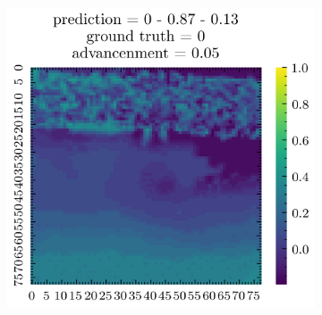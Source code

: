 \begin{figure}[H]
\begin{subfigure}[b]{0.19\textwidth}
    \end{subfigure}  
    \begin{subfigure}[b]{0.19\textwidth}
        \includegraphics[width=\linewidth]{../img/5/quarry/worst/patch-2d-4.png}
    \end{subfigure}  


\end{figure}
